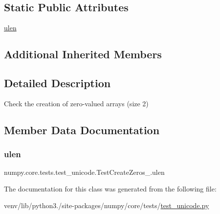 \subsection*{Static Public Attributes}
\begin{DoxyCompactItemize}
\item 
\hyperlink{classnumpy_1_1core_1_1tests_1_1test__unicode_1_1TestCreateZeros__2_a414a3b2d67fe4213965e877360dce311}{ulen}
\end{DoxyCompactItemize}
\subsection*{Additional Inherited Members}


\subsection{Detailed Description}
\begin{DoxyVerb}Check the creation of zero-valued arrays (size 2)\end{DoxyVerb}
 

\subsection{Member Data Documentation}
\mbox{\label{classnumpy_1_1core_1_1tests_1_1test__unicode_1_1TestCreateZeros__2_a414a3b2d67fe4213965e877360dce311}} 
\subsubsection{\texorpdfstring{ulen}{ulen}}
{\footnotesize\ttfamily numpy.\+core.\+tests.\+test\+\_\+unicode.\+Test\+Create\+Zeros\+\_.\+ulen\hspace{0.3cm}{\ttfamily [static]}}



The documentation for this class was generated from the following file\+:\begin{DoxyCompactItemize}
\item 
venv/lib/python3./site-\/packages/numpy/core/tests/\hyperlink{test__unicode_8py}{test\+\_\+unicode.\+py}\end{DoxyCompactItemize}
